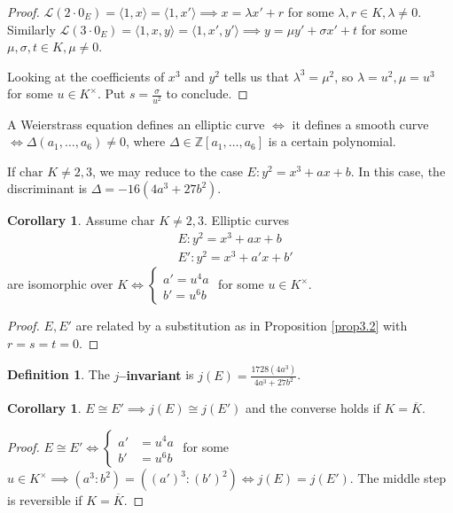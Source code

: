 \documentclass{article}
\theoremstyle{definition}
\newtheorem{cor}[theorem]{Corollary}
\newtheorem{defn}{Definition}[section]
\begin{document}
\begin{proof}
    $\mathcal{L}(2\cdot 0_E) = \langle 1, x \rangle = \langle 1, x' \rangle \implies x = \lambda x' + r$ for some ${\lambda, r \in K, \lambda \neq 0}$. Similarly $\mathcal{L}(3\cdot 0_E) = \langle 1,x,y \rangle = \langle 1,x',y' \rangle \implies y = \mu y' + \sigma x' + t$ for some $\mu, \sigma, t \in K, \mu \neq 0$. 
    \vspace{1mm}
     
    Looking at the coefficients of $x^3$ and $y^2$ tells us that $\lambda^3 = \mu^2$, so $\lambda = u^2, \mu = u^3$ for some $u \in K^\times$. Put $s = \frac{\sigma}{u^2}$ to conclude.
\end{proof}

A Weierstrass equation defines an elliptic curve $\iff$ it defines a smooth curve $\iff \Delta(a_1,\ldots,a_6) \neq 0$, where $\Delta \in \mathbb{Z}[a_1,\ldots,a_6]$ is a certain polynomial.

\vspace{1mm}
 
If $\text{char }K \neq 2,3$, we may reduce to the case $E: y^2 = x^3 + ax + b$. In this case, the discriminant is $\Delta = -16(4a^3 + 27b^2)$.
\begin{cor}
    Assume $\text{char }K \neq 2,3$. Elliptic curves 
    \begin{align*}
        &E : y^2 = x^3 + ax + b \\
        &E' : y^2 = x^3 + a'x + b'
    \end{align*}
    are isomorphic over $K \iff \begin{cases}
        a' = u^4 a \\
        b' = u^6 b
    \end{cases}$ for some $u \in K^\times$.
\end{cor}
\begin{proof}
    $E, E'$ are related by a substitution as in Proposition \ref{prop3.2} with $r=s=t=0$.
\end{proof}
\begin{defn}
    The \textbf{$j$--invariant} is $j(E) = \frac{1728(4a^3)}{4a^3+27b^2}$.
\end{defn}
\begin{cor}
    $E \cong E' \implies j(E) \cong j(E')$ and the converse holds if $K = \overline{K}$.
\end{cor}
\begin{proof}
    $E \cong E' \iff \begin{cases}
        a' &= u^4 a \\
        b' &= u^6 b
    \end{cases}$ for some $u \in K^\times \implies (a^3:b^2) = ((a')^3:(b')^2) \iff j(E) = j(E')$. The middle step is reversible if $K=\overline{K}$.
\end{proof}
\end{document}
